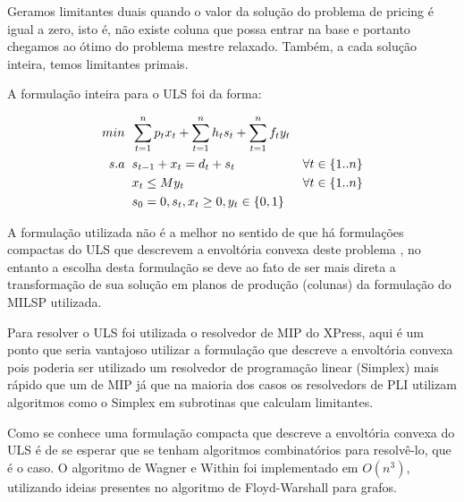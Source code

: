 \documentclass[letterpaper,11pt]{article}
\begin{document}
Geramos limitantes duais quando o valor da solução do problema de
pricing é igual a zero, isto é, não existe coluna que possa entrar na
base e portanto chegamos ao ótimo do problema mestre relaxado. Também,
a cada solução inteira, temos limitantes primais.

A formulação inteira para o ULS foi da forma:

\begin{align}
  min \hspace{0.2cm}&  \sum_{t=1}^n p_tx_t + \sum_{t=1}^n h_ts_t + \sum_{t=1}^n
  f_ty_t \notag\\
  s.a \hspace{0.2cm}&  s_{t-1} + x_t = d_t + s_t &\forall t \in \{1..n\} \notag\\
      &  x_{t} \leq My_t &\forall t \in \{1..n\} \notag\\
      &  s_0 = 0, s_t, x_t \geq 0, y_t \in \{0,1\} \notag
\end{align}

A formulação utilizada não é a melhor no sentido de que há formulações
compactas do ULS que descrevem a envoltória convexa deste problema
\cite{wolsey2000ip}, no entanto a escolha desta formulação se deve ao
fato de ser mais direta a transformação de sua solução em planos de
produção (colunas) da formulação do MILSP utilizada.

Para resolver o ULS foi utilizada o resolvedor de MIP do XPress, aqui
é um ponto que seria vantajoso utilizar a formulação que descreve a
envoltória convexa pois poderia ser utilizado um resolvedor de
programação linear (Simplex) mais rápido que um de MIP já que na
maioria dos casos os resolvedors de PLI utilizam algoritmos como o
Simplex em subrotinas que calculam limitantes.



Como se conhece uma formulação compacta que descreve a envoltória
convexa do ULS é de se esperar que se tenham algoritmos combinatórios
para resolvê-lo, que é o caso. O algoritmo de Wagner e Within foi
implementado em $O(n^3)$, utilizando ideias presentes no algoritmo de
Floyd-Warshall para grafos.
\end{document}
